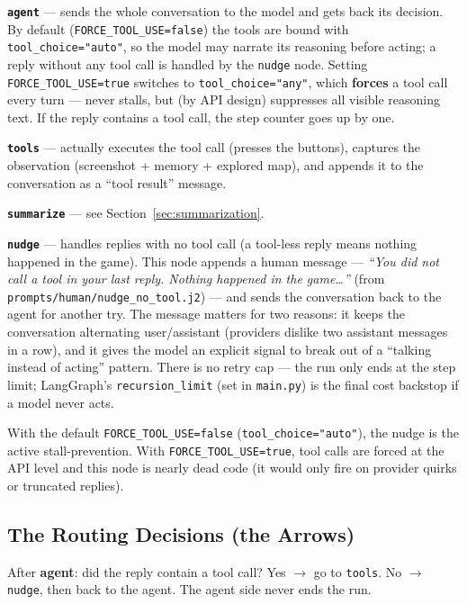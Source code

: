 \documentclass[11pt]{article}
\newcommand{\code}[1]{\texttt{#1}}
\begin{document}
\textbf{\code{agent}} --- sends the whole conversation to the model and gets back its decision. By default (\code{FORCE\_TOOL\_USE=false}) the tools are bound with \code{tool\_choice="auto"}, so the model may narrate its reasoning before acting; a reply without any tool call is handled by the \code{nudge} node. Setting \code{FORCE\_TOOL\_USE=true} switches to \code{tool\_choice="any"}, which \textbf{forces} a tool call every turn --- never stalls, but (by API design) suppresses all visible reasoning text. If the reply contains a tool call, the step counter goes up by one.

\textbf{\code{tools}} --- actually executes the tool call (presses the buttons), captures the observation (screenshot + memory + explored map), and appends it to the conversation as a ``tool result'' message.

\textbf{\code{summarize}} --- see Section~\ref{sec:summarization}.

\textbf{\code{nudge}} --- handles replies with no tool call (a tool-less reply means nothing happened in the game). This node appends a human message --- \emph{``You did not call a tool in your last reply. Nothing happened in the game\ldots''} (from \code{prompts/human/nudge\_no\_tool.j2}) --- and sends the conversation back to the agent for another try. The message matters for two reasons: it keeps the conversation alternating user/assistant (providers dislike two assistant messages in a row), and it gives the model an explicit signal to break out of a ``talking instead of acting'' pattern. There is no retry cap --- the run only ends at the step limit; LangGraph's \code{recursion\_limit} (set in \code{main.py}) is the final cost backstop if a model never acts.

With the default \code{FORCE\_TOOL\_USE=false} (\code{tool\_choice="auto"}), the nudge is the active stall-prevention. With \code{FORCE\_TOOL\_USE=true}, tool calls are forced at the API level and this node is nearly dead code (it would only fire on provider quirks or truncated replies).

\subsection{The Routing Decisions (the Arrows)}

After \textbf{agent}: did the reply contain a tool call? Yes $\rightarrow$ go to \code{tools}. No $\rightarrow$ \code{nudge}, then back to the agent. The agent side never ends the run.
\end{document}
